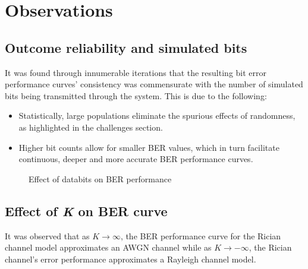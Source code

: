 \section{Observations}
\subsection{Outcome reliability and simulated bits}
It was found through innumerable iterations that the resulting bit error performance curves' consistency was commensurate with the number of simulated bits being transmitted through the system. This is due to the following:
\begin{itemize}
	\item Statistically, large populations eliminate the spurious effects of randomness, as highlighted in the challenges section.
		\item Higher bit counts allow for smaller BER values, which in turn facilitate continuous, deeper and more accurate BER performance curves.
\end{itemize}
\begin{figure}[!h]
	\centerline{}
	\caption{Effect of databits on BER performance}
	\label{res:fig:bervariation}
\end{figure}

\subsection{Effect of \emph{K} on BER curve}
It was observed that as \(K \to \infty\), the BER performance curve for the Rician channel model approximates an AWGN channel while as \(K \to -\infty\), the Rician channel's error performance approximates a Rayleigh channel model.


